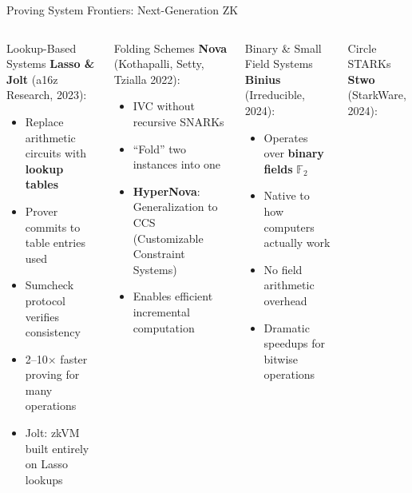 \documentclass[8pt,aspectratio=169]{beamer}
\begin{document}
\begin{frame}{Proving System Frontiers: Next-Generation ZK}
\begin{columns}[T]
\begin{block}{\footnotesize Lookup-Based Systems}
\footnotesize
\textbf{Lasso \& Jolt} (a16z Research, 2023):
\begin{itemize}
\item Replace arithmetic circuits with \textbf{lookup tables}
\item Prover commits to table entries used
\item Sumcheck protocol verifies consistency
\item 2--10$\times$ faster proving for many operations
\item Jolt: zkVM built entirely on Lasso lookups
\end{itemize}
\end{block}
\vspace{0.1cm}
\begin{block}{\footnotesize Folding Schemes}
\footnotesize
\textbf{Nova} (Kothapalli, Setty, Tzialla 2022):
\begin{itemize}
\item IVC without recursive SNARKs
\item ``Fold'' two instances into one
\item \textbf{HyperNova}: Generalization to CCS (Customizable Constraint Systems)
\item Enables efficient incremental computation
\end{itemize}
\end{block}
\begin{block}{\footnotesize Binary \& Small Field Systems}
\footnotesize
\textbf{Binius} (Irreducible, 2024):
\begin{itemize}
\item Operates over \textbf{binary fields} $\mathbb{F}_2$
\item Native to how computers actually work
\item No field arithmetic overhead
\item Dramatic speedups for bitwise operations
\end{itemize}
\end{block}
\vspace{0.1cm}
\begin{block}{\footnotesize Circle STARKs}
\footnotesize
\textbf{Stwo} (StarkWare, 2024):
\begin{itemize}

\end{itemize}
\end{block}
\end{columns}
\end{frame}
\end{document}
